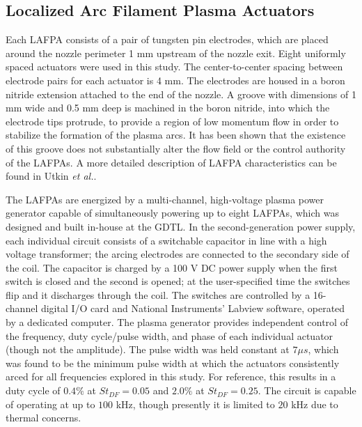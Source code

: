 \documentclass[english]{aiaa-tc}
\begin{document}
\subsection{Localized Arc Filament Plasma Actuators}\label{lafpa}
Each LAFPA consists of a pair of tungsten pin electrodes, which are placed around the nozzle perimeter 1 mm upstream of the nozzle exit. Eight uniformly spaced actuators were used in this study. The center-to-center spacing between electrode pairs for each actuator is 4 mm. The electrodes are housed in a boron nitride extension attached to the end of the nozzle. A groove with dimensions of 1 mm wide and 0.5 mm deep is machined in the boron nitride, into which the electrode tips protrude, to provide a region of low momentum flow in order to stabilize the formation of the plasma arcs. It has been shown that the existence of this groove does not substantially alter the flow field or the control authority of the LAFPAs\cite{hkfs-2011}. A more detailed description of LAFPA characteristics can be found in Utkin {\em et al.}\cite{uyg2007-1}.

The LAFPAs are energized by a multi-channel, high-voltage plasma power generator capable of simultaneously powering up to eight LAFPAs, which was designed and built in-house at the GDTL. In the second-generation power supply, each individual circuit consists of a switchable capacitor in line with a high voltage transformer; the arcing electrodes are connected to the secondary side of the coil. The capacitor is charged by a 100 V DC power supply when the first switch is closed and the second is opened; at the user-specified time the switches flip and it discharges through the coil. The switches are controlled by a 16-channel digital I/O card and National Instruments' Labview software, operated by a dedicated computer. The plasma generator provides independent control of the frequency, duty cycle/pulse width, and phase of each individual actuator (though not the amplitude). The pulse width was held constant at $7 \mu s$, which was found to be the minimum pulse width at which the actuators consistently arced for all frequencies explored in this study\cite{hkfs-2011}. For reference, this results in a duty cycle of $0.4\%$ at $St_{DF} = 0.05$ and $2.0\%$ at $St_{DF} = 0.25$. The circuit is capable of operating at up to $100$ kHz, though presently it is limited to $20$ kHz due to thermal concerns. 
\end{document}

